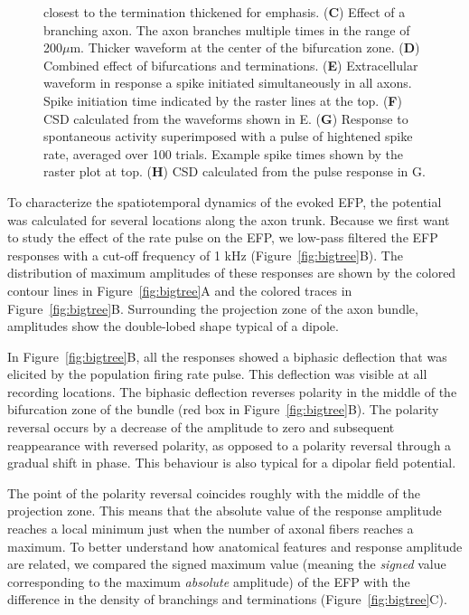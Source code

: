 \documentclass[]{article}
\begin{document}
\begin{figure}[htbp]
{closest to the termination thickened for emphasis. (\textbf{C}) Effect
of a branching axon. The axon branches multiple times in the range of
200\(\mu\)m. Thicker waveform at the center of the bifurcation zone.
(\textbf{D}) Combined effect of bifurcations and terminations.
(\textbf{E}) Extracellular waveform in response a spike initiated
simultaneously in all axons. Spike initiation time indicated by the
raster lines at the top. (\textbf{F}) CSD calculated from the waveforms
shown in E. (\textbf{G}) Response to spontaneous activity superimposed
with a pulse of hightened spike rate, averaged over 100 trials. Example
spike times shown by the raster plot at top. (\textbf{H}) CSD calculated
from the pulse response in G.}
\end{figure}

To characterize the spatiotemporal dynamics of the evoked EFP, the
potential was calculated for several locations along the axon trunk.
Because we first want to study the effect of the rate pulse on the EFP,
we low-pass filtered the EFP responses with a cut-off frequency of 1 kHz
(Figure~\ref{fig:bigtree}B). The distribution of maximum amplitudes of
these responses are shown by the colored contour lines in
Figure~\ref{fig:bigtree}A and the colored traces in
Figure~\ref{fig:bigtree}B. Surrounding the projection zone of the axon
bundle, amplitudes show the double-lobed shape typical of a dipole.

In Figure~\ref{fig:bigtree}B, all the responses showed a biphasic
deflection that was elicited by the population firing rate pulse. This
deflection was visible at all recording locations. The biphasic
deflection reverses polarity in the middle of the bifurcation zone of
the bundle (red box in Figure~\ref{fig:bigtree}B). The polarity reversal
occurs by a decrease of the amplitude to zero and subsequent
reappearance with reversed polarity, as opposed to a polarity reversal
through a gradual shift in phase. This behaviour is also typical for a
dipolar field potential.

The point of the polarity reversal coincides roughly with the middle of
the projection zone. This means that the absolute value of the response
amplitude reaches a local minimum just when the number of axonal fibers
reaches a maximum. To better understand how anatomical features and
response amplitude are related, we compared the signed maximum value
(meaning the \emph{signed} value corresponding to the maximum
\emph{absolute} amplitude) of the EFP with the difference in the density
of branchings and terminations (Figure~\ref{fig:bigtree}C).
\end{document}
